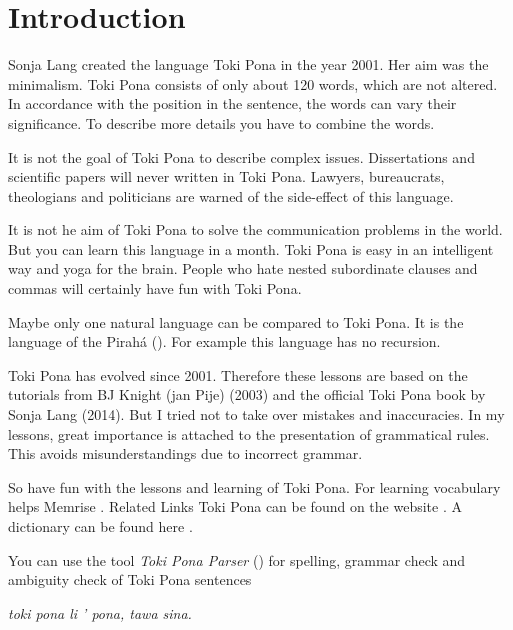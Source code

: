 \section{Introduction}
%
Sonja Lang created the language Toki Pona in the year 2001. 
Her aim was the minimalism. 
Toki Pona consists of only about 120 words, which are not altered. 
In accordance with the position in the sentence, the words can vary their significance. 
To describe more details you have to combine the words.

It is not the goal of Toki Pona to describe complex issues. 
Dissertations and scientific papers will never written in Toki Pona. 
Lawyers, bureaucrats, theologians and politicians are warned of the side-effect of this language.

It is not he aim of Toki Pona to solve the communication problems in the world. 
But you can learn this language in a month. 
Toki Pona is easy in an intelligent way and yoga for the brain. 
People who hate nested subordinate clauses and commas will certainly have fun with Toki Pona.

Maybe only one natural language can be compared to Toki Pona. 
It is the language of the Pirah\'{a} (\cite{www:piraha:01}). 
For example this language has no recursion. 

%
%
Toki Pona has evolved since 2001. 
Therefore these lessons are based on the tutorials from BJ Knight (jan Pije) \cite{www:Pije:01} (2003) and the official Toki Pona book \cite{www:tokipona.org} by Sonja Lang (2014). 
But I tried not to take over mistakes and inaccuracies. 
In my lessons, great importance is attached to the presentation of grammatical rules. 
This avoids misunderstandings due to incorrect grammar.

So have fun with the lessons and learning of Toki Pona. 
For learning vocabulary helps Memrise \cite{www:memrise:01}. Related Links Toki Pona can be found on the website \cite{www:rowa:01}. 
A dictionary can be found here \cite{www:rowa:01}. 

You can use the tool \textit{Toki Pona Parser} (\cite{www:rowa:02}) for spelling, grammar check and ambiguity check of Toki Pona sentences 


\textit{toki pona li ' pona, tawa sina.}
%
